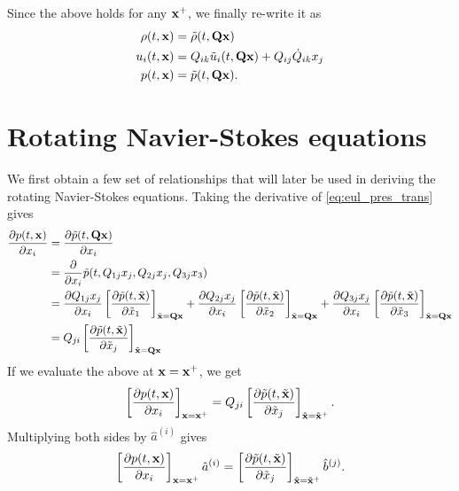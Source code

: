\documentclass[oneside,a4paper,11pt]{report}
\begin{document}
Since the above holds for any $\mathbf{x}^+$, we finally re-write it as
\begin{align}
    \rho(t,\mathbf{x}) &= \tilde{\rho}(t,\mathbf{Q} \mathbf{x}) \label{eq:eul_rho_trans}\\
    u_i(t,\mathbf{x}) &= Q_{ik} \tilde{u}_i(t,\mathbf{Q} \mathbf{x})  + Q_{ij} \dot{Q}_{ik} x_j \label{eq:eul_vel_trans}\\
    p(t,\mathbf{x}) &= \tilde{p}(t,\mathbf{Q} \mathbf{x}). \label{eq:eul_pres_trans}
\end{align}

\section{Rotating Navier-Stokes equations}
We first obtain a few set of relationships that will later be used in deriving the rotating Navier-Stokes equations. Taking the derivative of \cref{eq:eul_pres_trans} gives
\begin{align}
    \frac{\partial p(t,\mathbf{x})}{\partial x_i} &= \frac{ \partial \tilde{p}(t,\mathbf{Q} \mathbf{x})}{\partial x_i} \nonumber \\
    &= \frac{\partial}{\partial x_i} \tilde{p}(t,Q_{1j}x_j, Q_{2j}x_j, Q_{3j} x_3) \nonumber \\
    &= \frac{\partial Q_{1j}x_j}{\partial x_i} \left [ \frac{\partial \tilde{p}(t,\tilde{\mathbf{x}})}{\partial \tilde{x}_1} \right]_{ \tilde{\mathbf{x}} = \mathbf{Q} \mathbf{x}} + \frac{\partial Q_{2j}x_j}{\partial x_i} \left [ \frac{\partial \tilde{p}(t,\tilde{\mathbf{x}})}{\partial \tilde{x}_2} \right ]_{\tilde{\mathbf{x}} = \mathbf{Q} \mathbf{x}} + \frac{\partial Q_{3j}x_j}{\partial x_i} \left [ \frac{\partial \tilde{p}(t,\tilde{\mathbf{x}})}{\partial \tilde{x}_3} \right ]_{\tilde{\mathbf{x}} = \mathbf{Q} \mathbf{x}} \nonumber \\
    &= Q_{ji} \left [ \frac{\partial \tilde{p}(t,\tilde{\mathbf{x}})}{\partial \tilde{x}_j} \right ]_{\tilde{\mathbf{x}} = \mathbf{Q} \mathbf{x}}
\end{align}
If we evaluate the above at $\mathbf{x} = \mathbf{x}^+$, we get
\begin{equation}
    \left [ \frac{\partial p(t,\mathbf{x})}{\partial x_i} \right]_{\mathbf{x} = \mathbf{x}^+} = Q_{ji} \left [ \frac{\partial \tilde{p}(t,\tilde{\mathbf{x}})}{\partial \tilde{x}_j} \right]_{\tilde{\mathbf{x}} = \tilde{\mathbf{x}}^+}.
\end{equation}
Multiplying both sides by $\hat{a}^{(i)}$ gives
\begin{equation}
\label{eq:ns_pressure_rot_transform}
    \left [ \frac{\partial p(t,\mathbf{x})}{\partial x_i} \right]_{\mathbf{x} = \mathbf{x}^+} \hat{a}^{(i)} = \left [ \frac{\partial \tilde{p}(t,\tilde{\mathbf{x}})}{\partial \tilde{x}_j} \right]_{\tilde{\mathbf{x}} = \tilde{\mathbf{x}}^+} \hat{b}^{(j)}.
\end{equation}
\end{document}
